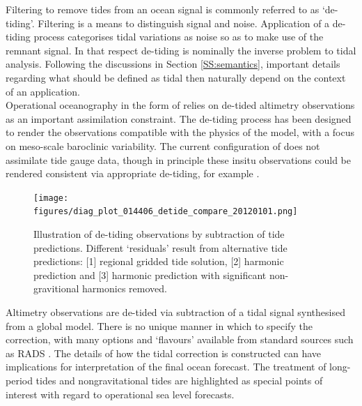 Filtering to remove tides from an ocean signal is commonly referred to as `de-tiding'.  Filtering is a means to distinguish signal and noise.  Application of a de-tiding process categorises tidal variations as noise so as to make use of the remnant signal.   In that respect de-tiding is nominally the inverse problem to tidal analysis.   Following the discussions in Section \ref{SS:semantics}, important details regarding what should be defined as tidal then naturally depend on the context of an application.\\
Operational oceanography in the form of \BL{} relies on de-tided altimetry observations as an important assimilation constraint.   The de-tiding process has been designed to render the observations compatible with the physics of the model, with a focus on meso-scale baroclinic variability. The current configuration of \BL{} does not assimilate tide gauge data, though in principle these insitu observations could be rendered consistent via appropriate de-tiding, for example \cite{Matsumoto:2000tg}.\\


\begin{figure}[h]
\begin{center}
\texttt{[image: figures/diag\_plot\_014406\_detide\_compare\_20120101.png]}
\caption{Illustration of de-tiding observations by subtraction of tide predictions.  Different `residuals' result from alternative tide predictions: [1] regional gridded tide solution, [2] harmonic prediction and [3] harmonic prediction with significant non-gravitional harmonics removed. }
\end{center}
\end{figure}


Altimetry observations are de-tided via subtraction of a tidal signal synthesised from a global model.  There is no unique manner in which to specify the correction, with many options and `flavours' available from standard sources such as RADS \citep[table 3.2]{Scharroo:2011vd}.  The details of how the tidal correction is constructed can have implications for interpretation of the final ocean forecast.   The treatment of long-period tides \citep{Egbert:2003jd} and nongravitational tides \citep{Arbic:2005gv} are highlighted as special points of interest with regard to operational sea level forecasts.\\




